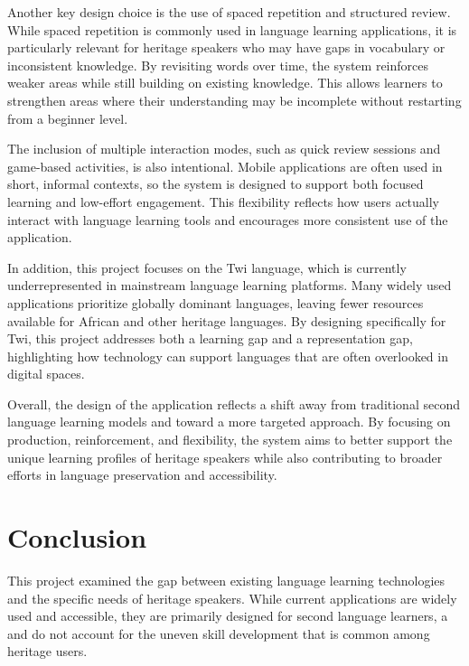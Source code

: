 \documentclass[12pt]{article}
\begin{document}
Another key design choice is the use of spaced repetition and structured review. While spaced repetition is commonly used in language learning applications, it is particularly relevant for heritage speakers who may have gaps in vocabulary or inconsistent knowledge. By revisiting words over time, the system reinforces weaker areas while still building on existing knowledge. This allows learners to strengthen areas where their understanding may be incomplete without restarting from a beginner level.

The inclusion of multiple interaction modes, such as quick review sessions and game-based activities, is also intentional. Mobile applications are often used in short, informal contexts, so the system is designed to support both focused learning and low-effort engagement. This flexibility reflects how users actually interact with language learning tools and encourages more consistent use of the application.

In addition, this project focuses on the Twi language, which is currently underrepresented in mainstream language learning platforms. Many widely used applications prioritize globally dominant languages, leaving fewer resources available for African and other heritage languages. By designing specifically for Twi, this project addresses both a learning gap and a representation gap, highlighting how technology can support languages that are often overlooked in digital spaces.

Overall, the design of the application reflects a shift away from traditional second language learning models and toward a more targeted approach. By focusing on production, reinforcement, and flexibility, the system aims to better support the unique learning profiles of heritage speakers while also contributing to broader efforts in language preservation and accessibility.


\section{Conclusion}
This project examined the gap between existing language learning technologies and the specific needs of heritage speakers. While current applications are widely used and accessible, they are primarily designed for second language learners, a  and do not account for the uneven skill development that is common among heritage users.
\end{document}
